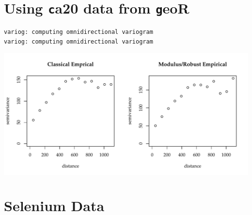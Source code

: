 \documentclass{article}\usepackage[]{graphicx}\usepackage[]{color}
\makeatletter
\def\maxwidth{ %
  \ifdim\Gin@nat@width>\linewidth
    \linewidth
  \else
    \Gin@nat@width
  \fi
}
\newenvironment{kframe}{%
 \def\at@end@of@kframe{}%
 \ifinner\ifhmode%
  \def\at@end@of@kframe{\end{minipage}}%
  \begin{minipage}{\columnwidth}%
 \fi\fi%
 \def\FrameCommand##1{\hskip\@totalleftmargin \hskip-\fboxsep
 \colorbox{shadecolor}{##1}\hskip-\fboxsep
     \hskip-\linewidth \hskip-\@totalleftmargin \hskip\columnwidth}%
 \MakeFramed {\advance\hsize-\width
   \@totalleftmargin\z@ \linewidth\hsize
   \@setminipage}}%
 {\par\unskip\endMakeFramed%
 \at@end@of@kframe}
\newenvironment{knitrout}{}{} %
\makeatother
\begin{document}
\section{Using {\texttt ca20} data from {\texttt geoR}}




\begin{knitrout}\footnotesize
{}\color{fgcolor}\begin{kframe}
\begin{verbatim}
variog: computing omnidirectional variogram
variog: computing omnidirectional variogram
\end{verbatim}
\end{kframe}

{\centering \includegraphics[width=\maxwidth]{figure/emp_var-1} 

}



\end{knitrout}









\section{Selenium Data}
\end{document}
